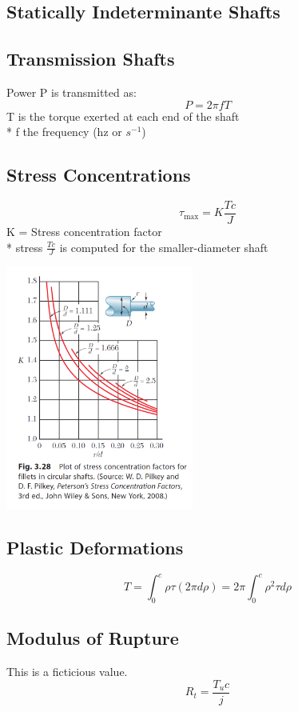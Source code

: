 \documentclass[10pt,landscape]{article}
\newenvironment{Figure}
     {\par\medskip\noindent\minipage{\linewidth}}
     {\endminipage\par\medskip}
\begin{document}
\begin{multicols}{3}
\subsection{Statically Indeterminante Shafts}
\subsection{Transmission Shafts}
Power P is transmitted as:
\begin{equation}
    P=2\pi fT
\end{equation}
T is the torque exerted at each end of the shaft\\*
f the frequency (hz or $s^{-1}$)
\subsection{Stress Concentrations}
\begin{equation}
    \tau_{\text{max}}=K\frac{Tc}{J}
\end{equation}
K = Stress concentration factor\\*
stress $\frac{Tc}{J}$ is computed for the smaller-diameter shaft
\begin{Figure}
    \centering
    \includegraphics[width=\linewidth, height=8cm]{PlotStressConcentrationsFilletsRoundShaft.png}
\end{Figure}
\subsection{Plastic Deformations}
\begin{equation}
    T=\int^c_0\rho\tau(2\pi d\rho)=2\pi\int^c_0\rho^2\tau d\rho
\end{equation}
\subsection{Modulus of Rupture}
This is a ficticious value.
\begin{equation}
    R_t=\frac{T_uc}{j}
\end{equation}

\end{multicols}
\end{document}
